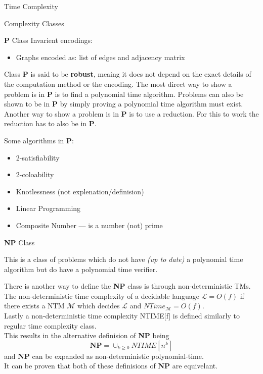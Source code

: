 \documentclass[12pt, letterpaper]{article}
\begin{document}
\begin{section}{Time Complexity}
\begin{subsection}{Complexity Classes}
\begin{subsubsection}{\textbf{P} Class}
      Invarient encodings:
      \begin{itemize}
        \item Graphs encoded as: list of edges and adjacency matrix
      \end{itemize}

      Class \textbf{P} is said to be \textbf{robust}, meaing it does not
      depend on the exact details of the computation method or the encoding.
      The most direct way to show a problem is in \textbf{P} is to find
      a polynomial time algorithm. Problems can also be shown to be in \textbf{P}
      by simply proving a polynomial time algorithm must exist.
      Another way to show a problem is in \textbf{P} is to use a reduction.
      For this to work the reduction has to also be in \textbf{P}.

      Some algorithms in \textbf{P}:
      \begin{itemize}
        \item 2-satisfiability
        \item 2-coloability
        \item Knotlessness (not explenation/definision)
        \item Linear Programming
        \item Composite Number --- is a number (not) prime
      \end{itemize}

    \end{subsubsection}

    \begin{subsubsection}{\textbf{NP} Class}

      This is a class of problems which do not have \textit{(up to date)}
      a polynomial time algorithm but do have a polynomial time verifier.

      There is another way to define the \textbf{NP} class is through
      non-deterministic TMs. The non-deterministic time complexity
      of a decidable language \(\mathscr{L} = O(f)\) if there exists a NTM
      \(\mathscr{M}\) which decides \(\mathscr{L}\) and \(NTime_{\mathscr{M}} = O(f)\). \\
      Lastly a non-deterministic time complexity NTIME[f] is defined similarly to
      regular time complexity class. \\
      This results in the alternative definision of \textbf{NP} being
      \[\textbf{NP} = \cup_{k \geq 0} NTIME[n^{k}]\]
      and \textbf{NP} can be expanded as non-deterministic polynomial-time. \\
      It can be proven that both of these definisions of \textbf{NP} are equivelant.


\end{subsubsection}
\end{subsection}
\end{section}
\end{document}
